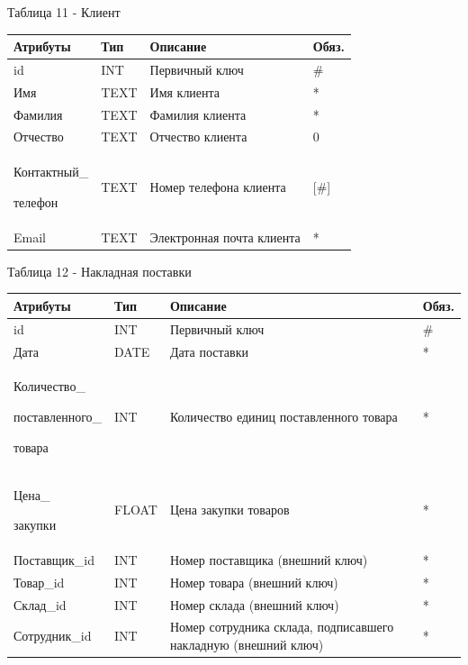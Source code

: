 \documentclass[14pt]{extreport}
\begin{document}
\noindent
Таблица 11 - Клиент
\begin{center}
\begin{longtable}{ |m{3.3cm}|m{3cm}|m{6cm}|m{1.8cm}| } 
 \hline
 Атрибуты & Тип & Описание & Обяз. \\ [0.5ex] 
 \hline\hline
 id & INT & Первичный ключ & \# \\
 \hline
 Имя & TEXT & Имя клиента & * \\
 \hline
 Фамилия & TEXT & Фамилия клиента & * \\
 \hline
 Отчество & TEXT & Отчество клиента & 0 \\
 \hline
 Контактный\_
 
 телефон & TEXT & Номер телефона клиента & [\#] \\
 \hline
 Email & TEXT & Электронная почта клиента & * \\
 \hline
\end{longtable}
\end{center}


\noindent
Таблица 12 - Накладная поставки
\begin{center}
\begin{longtable}{ |m{3.3cm}|m{3cm}|m{6cm}|m{1.8cm}| } 
 \hline
 Атрибуты & Тип & Описание & Обяз. \\ [0.5ex] 
 \hline\hline
 id & INT & Первичный ключ & \# \\
 \hline
 Дата & DATE & Дата поставки & * \\
 \hline
 Количество\_ 
 
 поставленного\_
 
 товара & INT & Количество единиц поставленного товара & * \\
 \hline
 Цена\_
 
 закупки & FLOAT & Цена закупки товаров  & * \\ 
 \hline
 Поставщик\_id & INT & Номер поставщика (внешний ключ) & * \\
 \hline
 Товар\_id & INT & Номер товара (внешний ключ) & * \\ 
 \hline
 Склад\_id & INT & Номер склада (внешний ключ) & * \\ 
 \hline
 Сотрудник\_id & INT & Номер сотрудника склада, подписавшего накладную (внешний ключ) & * \\ 
 \hline

 \hline
\end{longtable}
\end{center}


\newpage
\end{document}
